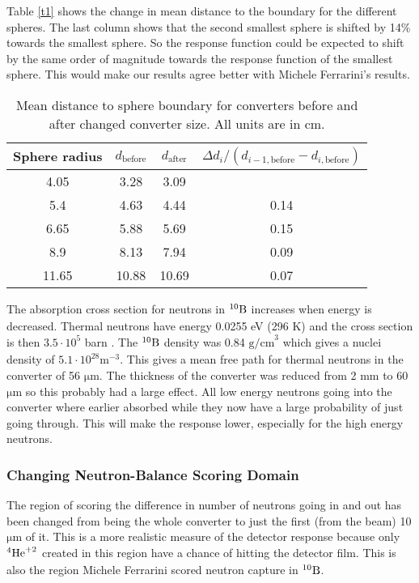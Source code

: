 \documentclass[a4paper,10pt]{article}
\newcommand{\nucl}[3]{
\ensuremath{
\phantom{\ensuremath{^{#1}_{#2}}}
\llap{\ensuremath{^{#1}}}
\llap{\ensuremath{_{\rule{0pt}{.75em}#2}}}
\mbox{#3}
}
}
\begin{document}
Table \ref{t1} shows the change in mean distance to the boundary for the different spheres. The last column shows that the second smallest sphere is shifted by 14\% towards the smallest sphere. So the response function could be expected to shift by the same order of magnitude towards the response function of the smallest sphere. This would make our results agree better with Michele Ferrarini's results.\\
\begin{table}
\label{t1}
\caption{Mean distance to sphere boundary for converters before and after changed converter size. All units are in cm.}
\centering 
\begin{tabular}{c c c c} 
\hline\hline 
Sphere radius & $d_{\mathrm{before}}$ & $d_{\mathrm{after}}$ & $\Delta d_{i}/(d_{i-1,\mathrm{before}}-d_{i,\mathrm{before}})$ \\
\hline
4.05&3.28&3.09&\\
5.4&4.63&4.44&0.14\\
6.65&5.88&5.69&0.15\\
8.9&8.13&7.94&0.09\\
11.65&10.88&10.69&0.07\\
\hline 
\end{tabular}
\label{table:nonlin}
\end{table}
The absorption cross section for neutrons in $\nucl{10}{}{B}$ increases when energy is decreased. Thermal neutrons have energy 0.0255 eV (296 K) and the cross section is then $3.5\cdot10^5$ barn \cite[Figure 14.1]{knoll2000radiation}. The $\nucl{10}{}{B}$ density was 0.84 $\mathrm{g/cm}^3$ which gives a nuclei density of $5.1\cdot10^{28}\mathrm{m}^{-3}$. This gives a mean free path for thermal neutrons in the converter of 56 $\mathrm{\mu m}$. The thickness of the converter was reduced from 2 mm to 60 $\mathrm{\mu m}$ so this probably had a large effect. All low energy neutrons going into the converter where earlier absorbed while they now have a large probability of just going through. This will make the response lower, especially for the high energy neutrons.

\subsubsection{Changing Neutron-Balance Scoring Domain}
The region of scoring the difference in number of neutrons going in and out has been changed from being the whole converter to just the first (from the beam) 10 $\mathrm{\mu m}$ of it. This is a more realistic measure of the detector response because only $\nucl{4}{}{He}^{+2}$ created in this region have a chance of hitting the detector film. This is also the region Michele Ferrarini scored neutron capture in $\nucl{10}{}{B}$.\\
\end{document}
